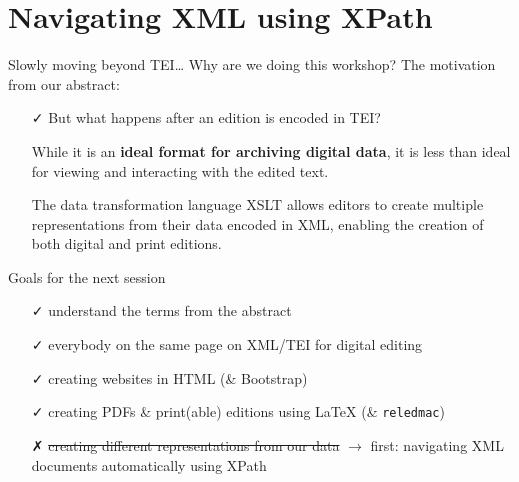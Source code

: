 
\section{Navigating XML using XPath}

\begin{frame}{Slowly moving beyond TEI\dots}
    Why are we doing this workshop? The motivation from our abstract:
    \begin{itemize}
        \item[\textcolor{w3schools}{\faCheck}] But what happens after an edition is encoded in TEI? 
        \item[\textcolor{w3schools}{\faHandORight}] While it is an \textbf{ideal format for archiving digital data}, it is \alert{less than ideal for viewing and interacting with the edited text.}
        \item[\textcolor{w3schools}{\faHandORight}] The data transformation language XSLT allows editors to create multiple representations from their data encoded in XML, enabling the creation of both digital and print editions. 
    \end{itemize}
    
    \begin{block}{Goals for the next session}
    \begin{enumerate}
        \item[\textcolor{w3schools}{\faCheck}] understand the terms from the abstract
        \item[\textcolor{w3schools}{\faCheck}] everybody on the same page on XML/TEI for digital editing
        \item[\textcolor{w3schools}{\faCheck}] creating websites in HTML (\& Bootstrap)
        \item[\textcolor{w3schools}{\faCheck}] creating PDFs \& print(able) editions using \LaTeX{} (\& \texttt{reledmac})
        \item[\textcolor{alert}{\faClose}] \sout{creating different representations from our data} $\to$ first: navigating XML documents automatically using XPath
    \end{enumerate}
    \end{block}
\end{frame}


